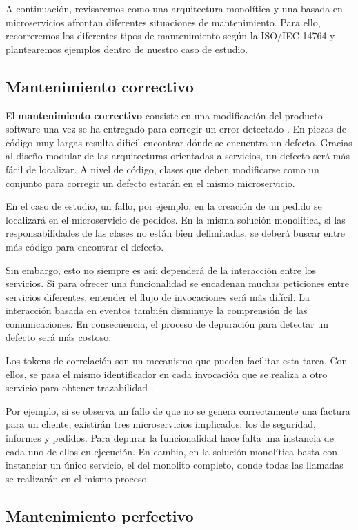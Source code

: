 \documentclass[11pt,spanish,listoffigures]{tfgetsinf}
\begin{document}
A continuación, revisaremos como una arquitectura monolítica y una basada en microservicios afrontan diferentes situaciones de mantenimiento. Para ello, recorreremos los diferentes tipos de mantenimiento según la ISO/IEC 14764 y plantearemos ejemplos dentro de nuestro caso de estudio. 

\subsection{Mantenimiento correctivo}

El \textbf{mantenimiento correctivo} consiste en una modificación del producto software una vez se ha entregado para corregir un error detectado \cite{Bourque2014}. En piezas de código muy largas resulta difícil encontrar dónde se encuentra un defecto. Gracias al diseño modular de las arquitecturas orientadas a servicios, un defecto será más fácil de localizar. A nivel de código, clases que deben modificarse como un conjunto para corregir un defecto estarán en el mismo microservicio.

En el caso de estudio, un fallo, por ejemplo, en la creación de un pedido se localizará en el microservicio de pedidos. En la misma solución monolítica, si las responsabilidades de las clases no están bien delimitadas, se deberá buscar entre más código para encontrar el defecto.

Sin embargo, esto no siempre es así: dependerá de la interacción entre los servicios. Si para ofrecer una funcionalidad se encadenan muchas peticiones entre servicios diferentes, entender el flujo de invocaciones será más difícil. La interacción basada en eventos también disminuye la comprensión de las comunicaciones. En consecuencia, el proceso de depuración para detectar un defecto será más costoso. 

Los tokens de correlación son un mecanismo que pueden facilitar esta tarea. Con ellos, se pasa el mismo identificador en cada invocación que se realiza a otro servicio para obtener trazabilidad \cite{Baum2016}.

Por ejemplo, si se observa un fallo de que no se genera correctamente una factura para un cliente, existirán tres microservicios implicados: los de seguridad, informes y pedidos. Para depurar la funcionalidad hace falta una instancia de cada uno de ellos en ejecución. En cambio, en la solución monolítica basta con instanciar un único servicio, el del monolito completo, donde todas las llamadas se realizarán en el mismo proceso.

\subsection{Mantenimiento perfectivo}
\end{document}
